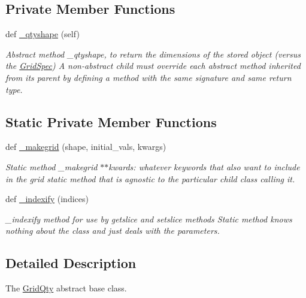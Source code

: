 \subsection*{Private Member Functions}
\begin{DoxyCompactItemize}
\item 
def \hyperlink{classMain__PDE__Repo_1_1src_1_1grid_1_1GridQty_a0c68e16bd939efac875a60f539bb66f6}{\+\_\+qtyshape} (self)
\begin{DoxyCompactList}\small\item\em Abstract method \+\_\+qtyshape, to return the dimensions of the stored object (versus the \hyperlink{classMain__PDE__Repo_1_1src_1_1grid_1_1GridSpec}{Grid\+Spec}) A non-\/abstract child must override each abstract method inherited from its parent by defining a method with the same signature and same return type. \end{DoxyCompactList}\end{DoxyCompactItemize}
\subsection*{Static Private Member Functions}
\begin{DoxyCompactItemize}
\item 
def \hyperlink{classMain__PDE__Repo_1_1src_1_1grid_1_1GridQty_af7f9a9ebb90e4911e7292e721f7d1de9}{\+\_\+makegrid} (shape, initial\+\_\+vals, kwargs)
\begin{DoxyCompactList}\small\item\em Static method \+\_\+makegrid $\ast$$\ast$kwards\+: whatever keywords that also want to include in the grid static method that is agnostic to the particular child class calling it. \end{DoxyCompactList}\item 
def \hyperlink{classMain__PDE__Repo_1_1src_1_1grid_1_1GridQty_a048ff999254cfe9420fd377a6edc289b}{\+\_\+indexify} (indices)
\begin{DoxyCompactList}\small\item\em \+\_\+indexify method for use by getslice and setslice methods Static method knows nothing about the class and just deals with the parameters. \end{DoxyCompactList}\end{DoxyCompactItemize}


\subsection{Detailed Description}
The \hyperlink{classMain__PDE__Repo_1_1src_1_1grid_1_1GridQty}{Grid\+Qty} abstract base class. 

